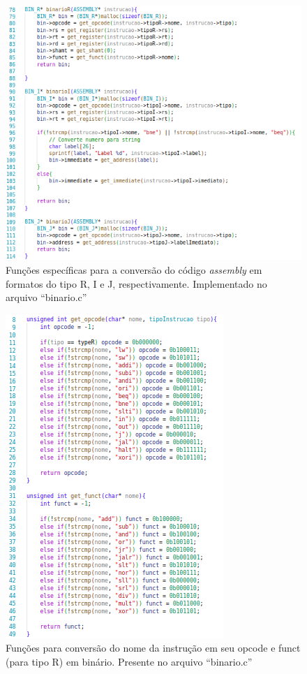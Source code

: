 \documentclass[
	12pt,				%
	oneside,
	a4paper,			%
	english,			%
	french,				%
	spanish,			%
	brazil,				%
	]{abntex2}
\begin{document}
\begin{figure}[htbp]
\centering 
\caption{Funções específicas para a conversão do código \emph{assembly} em formatos do tipo R, I e J, respectivamente. Implementado no arquivo \nohyphens{``binario.c''}} 
\label{fig:ConversaoBinario}
\graphicspath{ {./imgs/} } 
\includegraphics[scale=0.5]{imgs/Codigo/Binario_Conversao.png}
\end{figure}

\begin{figure}[htbp]
\centering 
\caption{Funções para conversão do nome da instrução em seu opcode e funct (para tipo R) em binário. Presente no arquivo \nohyphens{``binario.c''}} 
\label{fig:BinarioOpcodeFunct}
\graphicspath{ {./imgs/} } 
\includegraphics[scale=0.5]{imgs/Codigo/Binario_opcode_funct.png}
\end{figure}
\end{document}
